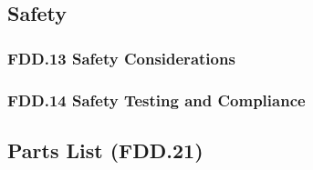 \subsection{Safety}
\subsubsection{FDD.13 Safety Considerations}
 
\subsubsection{FDD.14 Safety Testing and Compliance}
 
\subsection{Parts List (FDD.21)}

\newpage